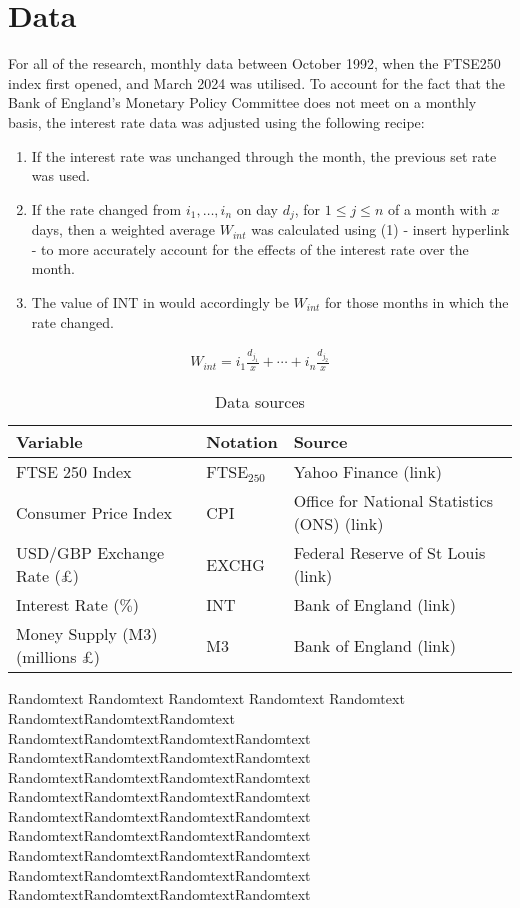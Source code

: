 \documentclass[12pt,a4paper]{article}
\begin{document}
\section{Data}

For all of the research, monthly data between October 1992, when the FTSE250 index first opened, and March 2024 was utilised. 
To account for the fact that the Bank of England’s Monetary Policy Committee does not meet on a monthly basis, the interest rate data was 
adjusted using the following recipe:
\begin{enumerate}
    \item If the interest rate was unchanged through the month, the previous set rate was used.
    \item If the rate changed from $i_1,\ldots,i_n$ on day $d_j$, for $1\leq j\leq n$ of a month with $x$ days, then a weighted average $W_{int}$ was calculated using (1) - insert hyperlink - to more accurately account for the effects of the interest rate over the month. 
    \item The value of INT in would accordingly be $W_{int}$ for those months in which the rate changed. 
\end{enumerate}

\begin{align}
    W_{int} = i_1 \frac{d_{j_1}}{x} + \cdots +i_n\frac{d_{j_2}}{x}
\end{align}

\begin{table}[h!]
    \centering
    \caption{Data sources}
    \begin{tabular}{lll}
        \toprule
        \textbf{Variable} & \textbf{Notation} & \textbf{Source} \\
        \midrule
        FTSE 250 Index & FTSE$_{250}$ & Yahoo Finance (link) \\
        Consumer Price Index & CPI & Office for National Statistics (ONS) (link) \\
        USD/GBP Exchange Rate (£) & EXCHG & Federal Reserve of St Louis (link)\\
        Interest Rate ($\%$) & INT & Bank of England (link) \\
        Money Supply (M3) (millions £) & M3 & Bank of England (link) \\
        \bottomrule
    \end{tabular}
\end{table}

Randomtext
Randomtext
Randomtext
Randomtext
Randomtext
RandomtextRandomtextRandomtext
RandomtextRandomtextRandomtextRandomtext
RandomtextRandomtextRandomtextRandomtext
RandomtextRandomtextRandomtextRandomtext
RandomtextRandomtextRandomtextRandomtext
RandomtextRandomtextRandomtextRandomtext
RandomtextRandomtextRandomtextRandomtext
RandomtextRandomtextRandomtextRandomtext
RandomtextRandomtextRandomtextRandomtext
RandomtextRandomtextRandomtextRandomtext
\end{document}
